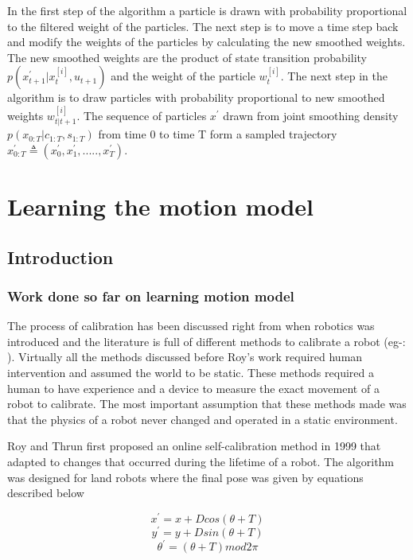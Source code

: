\documentclass[12pt]{dalcsthesis}
\begin{document}
In the first step of the algorithm a particle is drawn with probability proportional to the filtered weight of the particles. The next step is to move a time step back and modify the weights of the particles by calculating the new smoothed weights. The new smoothed weights are the product of state transition probability $p(x ^{'} _{t+1}|x_{t}^{[i]},u _{t+1})$ and the weight of the particle $w_{t}^{[i]}$. The next step in the algorithm is to draw particles with probability proportional to new smoothed weights $w_{t|t+1}^{[i]}$.  The sequence of particles $x^{'}$ drawn from joint smoothing density $p(x_{0:T}|c_{1:T},s_{1:T})$ from time 0 to time T form a sampled trajectory $x^{'}_{0:T} \triangleq (x^{'}_0,x^{'}_1,.....,x^{'}_T)$.
 
\chapter{Learning the motion model}
\label{learning the motion model}
\section{Introduction}
\subsection{Work done so far on learning motion model}
The process of calibration has been discussed right from when robotics was introduced and the literature is full of different methods to calibrate a robot (eg-: \cite{cox1990autonomous} \cite{vukobratovic1989introduction}). Virtually all the methods discussed before Roy's work \cite{Roy} required human intervention and assumed the world to be static. These methods required a human to have experience and a device to measure the exact movement of a robot to calibrate. The most important assumption that these methods made was that the physics of a robot never changed and operated in a static environment. 

Roy and Thrun first proposed an online self-calibration method \cite{Roy} in 1999 that adapted to changes that occurred during the lifetime of a robot. The algorithm was designed for land robots where the final pose was given by equations described below

\begin{equation}
x^{'}=x+Dcos(\theta+T)
\end{equation}
\begin{equation}
y^{'}=y+Dsin(\theta+T)
\end{equation}
\begin{equation}
\theta^{'}=(\theta+T)mod2\pi
\end{equation}
\end{document}
